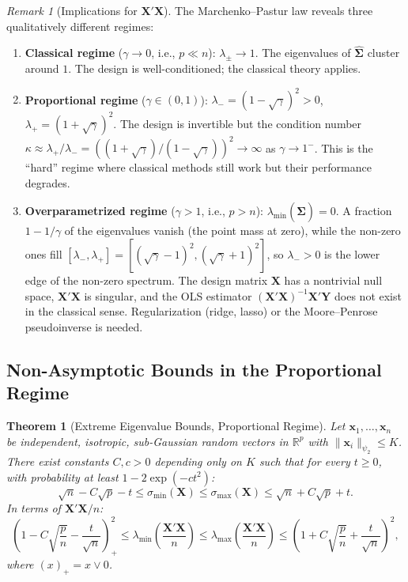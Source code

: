 \documentclass[14pt]{extarticle}
\theoremstyle{plain}
\newtheorem{theorem}{Theorem}[section]
\theoremstyle{definition}
\theoremstyle{remark}
\newtheorem*{remark}{Remark}
\newcommand{\bX}{\mathbf{X}}
\newcommand{\bY}{\mathbf{Y}}
\newcommand{\bx}{\mathbf{x}}
\newcommand{\Real}{\mathbb{R}}
\newcommand{\hbSigma}{\hat{\boldsymbol{\Sigma}}}
\begin{document}
\begin{remark}[Implications for $\bX'\bX$]
The Marchenko--Pastur law reveals three qualitatively different regimes:
\begin{enumerate}[label=\textup{(\arabic*)}]
\item \textbf{Classical regime} ($\gamma \to 0$, i.e., $p \ll n$): $\lambda_\pm \to 1$. The eigenvalues of $\hbSigma$ cluster around $1$. The design is well-conditioned; the classical theory applies.
\item \textbf{Proportional regime} ($\gamma \in (0, 1)$): $\lambda_- = (1 - \sqrt\gamma)^2 > 0$, $\lambda_+ = (1 + \sqrt\gamma)^2$. The design is invertible but the condition number $\kappa \approx \lambda_+/\lambda_- = ((1+\sqrt\gamma)/(1-\sqrt\gamma))^2 \to \infty$ as $\gamma \to 1^-$. This is the ``hard'' regime where classical methods still work but their performance degrades.
\item \textbf{Overparametrized regime} ($\gamma > 1$, i.e., $p > n$): $\lambda_{\min}(\hbSigma) = 0$. A fraction $1 - 1/\gamma$ of the eigenvalues vanish (the point mass at zero), while the non-zero ones fill $[\lambda_-, \lambda_+] = [(\sqrt\gamma - 1)^2, (\sqrt\gamma + 1)^2]$, so $\lambda_- > 0$ is the lower edge of the non-zero spectrum. The design matrix $\bX$ has a nontrivial null space, $\bX'\bX$ is singular, and the OLS estimator $(\bX'\bX)^{-1}\bX'\bY$ does not exist in the classical sense. Regularization (ridge, lasso) or the Moore--Penrose pseudoinverse is needed.
\end{enumerate}
\end{remark}

\subsection{Non-Asymptotic Bounds in the Proportional Regime}

\begin{theorem}[Extreme Eigenvalue Bounds, Proportional Regime]\label{thm:extreme-eigenvalues}
Let $\bx_1, \ldots, \bx_n$ be independent, isotropic, sub-Gaussian random vectors in $\Real^p$ with $\|\bx_i\|_{\psi_2} \leqslant K$. There exist constants $C, c > 0$ depending only on $K$ such that for every $t \geqslant 0$, with probability at least $1 - 2\exp(-ct^2)$:
\begin{equation}\label{eq:extreme-eigenvalues}
\sqrt{n} - C\sqrt{p} - t \leqslant \sigma_{\min}(\bX) \leqslant \sigma_{\max}(\bX) \leqslant \sqrt{n} + C\sqrt{p} + t.
\end{equation}
In terms of $\bX'\bX/n$:
\begin{equation}\label{eq:extreme-eigenvalues-gram}
\left(1 - C\sqrt{\frac{p}{n}} - \frac{t}{\sqrt{n}}\right)_{\!+}^2 \leqslant \lambda_{\min}\!\left(\frac{\bX'\bX}{n}\right) \leqslant \lambda_{\max}\!\left(\frac{\bX'\bX}{n}\right) \leqslant \left(1 + C\sqrt{\frac{p}{n}} + \frac{t}{\sqrt{n}}\right)^2,
\end{equation}
where $(x)_+ = x \vee 0$.
\end{theorem}
\end{document}
